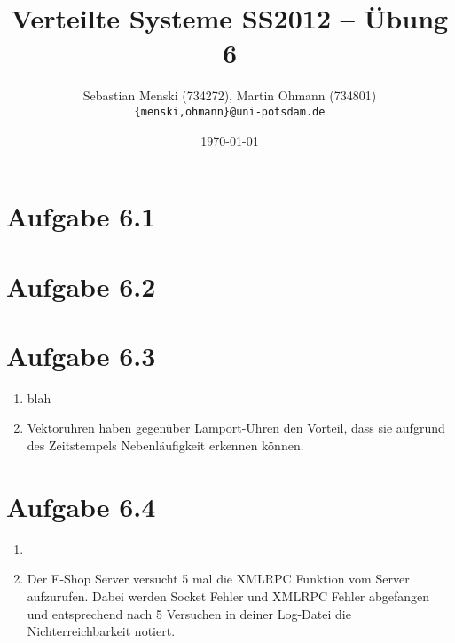 \documentclass[german,12pt,a4paper]{article}
\begin{document}
\title{\textbf{Verteilte Systeme SS2012 -- Übung 6}}
\author{Sebastian Menski (734272), Martin Ohmann (734801) \\ \texttt{\{menski,ohmann\}@uni-potsdam.de}}
\date{\today}

\maketitle

\section*{Aufgabe 6.1}

\section*{Aufgabe 6.2}

\section*{Aufgabe 6.3}
	\begin{enumerate}
		\item blah
		\item Vektoruhren haben gegenüber Lamport-Uhren den Vorteil, dass sie aufgrund des Zeitstempels
			Nebenläufigkeit erkennen können. 
	\end{enumerate}

\section*{Aufgabe 6.4}

\begin{enumerate}
	\item
	\item Der E-Shop Server versucht 5 mal die XMLRPC Funktion vom Server aufzurufen. Dabei werden Socket Fehler und XMLRPC Fehler abgefangen und entsprechend nach 5 Versuchen in deiner Log-Datei die Nichterreichbarkeit notiert.
\end{enumerate}
\end{document}
